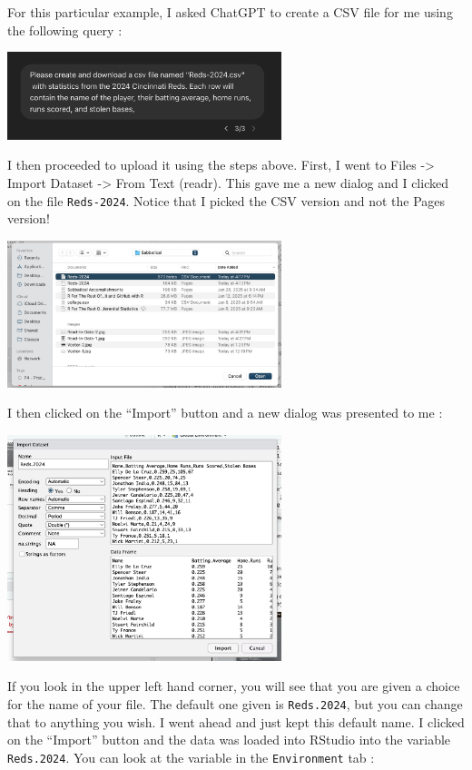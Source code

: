 \documentclass[
  letterpaper,
  DIV=11,
  numbers=noendperiod]{scrreprt}
\begin{document}
For this particular example, I asked ChatGPT to create a CSV file for me
using the following query :

\includegraphics[width=0.6\textwidth,height=\textheight]{./images/Read-In-Data-6.jpg}

I then proceeded to upload it using the steps above. First, I went to
Files -\textgreater{} Import Dataset -\textgreater{} From Text (readr).
This gave me a new dialog and I clicked on the file \texttt{Reds-2024}.
Notice that I picked the CSV version and not the Pages version!

\includegraphics[width=0.6\textwidth,height=\textheight]{./images/Read-In-Data-3.jpg}

I then clicked on the ``Import'' button and a new dialog was presented
to me :

\includegraphics[width=0.6\textwidth,height=\textheight]{./images/Read-In-Data-4.jpg}

If you look in the upper left hand corner, you will see that you are
given a choice for the name of your file. The default one given is
\texttt{Reds.2024}, but you can change that to anything you wish. I went
ahead and just kept this default name. I clicked on the ``Import''
button and the data was loaded into RStudio into the variable
\texttt{Reds.2024}. You can look at the variable in the
\texttt{Environment} tab :
\end{document}
